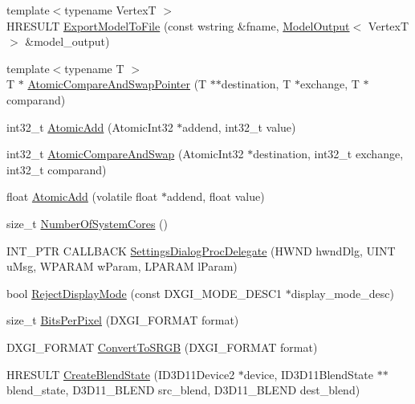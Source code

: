 \begin{DoxyCompactItemize}
\item 
{\footnotesize template$<$typename VertexT $>$ }\\H\+R\+E\+S\+U\+LT \hyperlink{namespacemage_a649e8c5136fa1a868d5b7441e4d041f0}{Export\+Model\+To\+File} (const wstring \&fname, \hyperlink{structmage_1_1_model_output}{Model\+Output}$<$ VertexT $>$ \&model\+\_\+output)
\item 
{\footnotesize template$<$typename T $>$ }\\T $\ast$ \hyperlink{namespacemage_aed89242e67231f3ddef77bdc63b32b6c}{Atomic\+Compare\+And\+Swap\+Pointer} (T $\ast$$\ast$destination, T $\ast$exchange, T $\ast$comparand)
\item 
int32\+\_\+t \hyperlink{namespacemage_ad397e742fa7e3532686fd46bb50e8166}{Atomic\+Add} (Atomic\+Int32 $\ast$addend, int32\+\_\+t value)
\item 
int32\+\_\+t \hyperlink{namespacemage_a03da57cfa5ba14d4aa0472ae49ec5c7e}{Atomic\+Compare\+And\+Swap} (Atomic\+Int32 $\ast$destination, int32\+\_\+t exchange, int32\+\_\+t comparand)
\item 
float \hyperlink{namespacemage_a0de5ff6241a0474f4572c7c3ba342098}{Atomic\+Add} (volatile float $\ast$addend, float value)
\item 
size\+\_\+t \hyperlink{namespacemage_afe0cda2eaeef24c7e3ee5d7a739b81e4}{Number\+Of\+System\+Cores} ()
\item 
I\+N\+T\+\_\+\+P\+TR C\+A\+L\+L\+B\+A\+CK \hyperlink{namespacemage_a6b352e8d2bf3eeccf1a5dec3f1cf4130}{Settings\+Dialog\+Proc\+Delegate} (H\+W\+ND hwnd\+Dlg, U\+I\+NT u\+Msg, W\+P\+A\+R\+AM w\+Param, L\+P\+A\+R\+AM l\+Param)
\item 
bool \hyperlink{namespacemage_abdccde1f16aa2239019e1b455d8b941b}{Reject\+Display\+Mode} (const D\+X\+G\+I\+\_\+\+M\+O\+D\+E\+\_\+\+D\+E\+S\+C1 $\ast$display\+\_\+mode\+\_\+desc)
\item 
size\+\_\+t \hyperlink{namespacemage_a782fb3970da2fbbc93627f7324c193aa}{Bits\+Per\+Pixel} (D\+X\+G\+I\+\_\+\+F\+O\+R\+M\+AT format)
\item 
D\+X\+G\+I\+\_\+\+F\+O\+R\+M\+AT \hyperlink{namespacemage_a9d84163ab692956f5f4537a965238a09}{Convert\+To\+S\+R\+GB} (D\+X\+G\+I\+\_\+\+F\+O\+R\+M\+AT format)
\item 
H\+R\+E\+S\+U\+LT \hyperlink{namespacemage_ad2c838028ab44521fe1818721dd7ade1}{Create\+Blend\+State} (I\+D3\+D11\+Device2 $\ast$device, I\+D3\+D11\+Blend\+State $\ast$$\ast$blend\+\_\+state, D3\+D11\+\_\+\+B\+L\+E\+ND src\+\_\+blend, D3\+D11\+\_\+\+B\+L\+E\+ND dest\+\_\+blend)
\item 

\end{DoxyCompactItemize}
